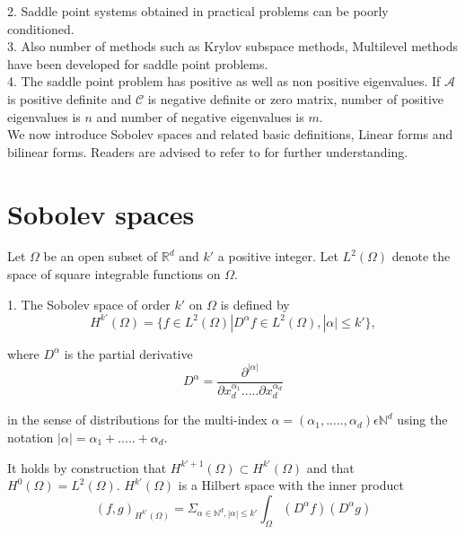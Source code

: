\documentclass[a4paper]{book}
\begin{document}
2. Saddle point systems obtained in practical problems can be poorly conditioned.\\

3. Also number of methods such as Krylov subspace methods, Multilevel methods have been developed for saddle point problems.\\

4. The saddle point problem has positive as well as non positive eigenvalues. If $\mathcal{A}$ is positive definite and $\mathcal{C}$ is negative definite or zero matrix, number of positive eigenvalues is $n$ and number of negative eigenvalues is $m$. \\

We now introduce Sobolev spaces and related basic definitions, Linear forms and bilinear forms. Readers are advised to refer to \cite{crbm} for further understanding.

\section{Sobolev spaces} 

Let $\Omega$ be an open subset of $\mathbb{R}^d$ and $k'$ a positive integer. Let $L^2(\Omega)$ denote the space of square integrable functions on $\Omega$. 

1. The Sobolev space of order $k'$ on $\Omega$ is defined by\\
\begin{equation}
H^{k'} (\Omega) = \lbrace f \in L^2 (\Omega) | D^\alpha f \in L^2 (\Omega), |\alpha| \leq k' \rbrace ,
\end{equation} 

where $D^\alpha$ is the partial derivative
\begin{equation}
D^\alpha = \frac{\partial^{|\alpha|}}{\partial x_d^{\alpha_1} ..... \partial x_d^{\alpha_d}}
\end{equation}

in the sense of distributions for the multi-index $\alpha = (\alpha_1,.....,\alpha_d) \epsilon \mathbb{N}^d$ using the notation $|\alpha| = \alpha_1 + ..... + \alpha_d $.

It holds by construction that $H^{k'+1}(\Omega) \subset H^{k'} (\Omega)$ and that $H^0 (\Omega) = L^2 (\Omega)$. $H^{k'}(\Omega)$ is a Hilbert space with the inner product
\begin{equation}
(f,g)_{H^{k'}(\Omega)} = \Sigma_{\alpha \in \mathbb{N}^d, |\alpha| \leq k'} \int_\Omega (D^\alpha f) (D^\alpha g)
\end{equation}
\end{document}
